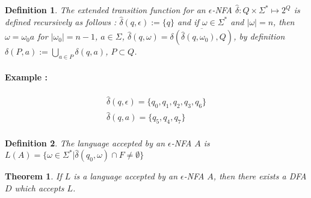 \documentclass[a4paper,11pt]{article}
\newtheorem{mydef}{Definition}
\newtheorem{thm}{Theorem}[section]
\begin{document}
\begin{mydef}
  The extended transition function for an $\epsilon$-NFA $\widehat{\delta} : Q
  \times \Sigma^* \mapsto 2^Q$ is defined recursively as follows :
  $\widehat{\delta}(q,\epsilon) := \{q\}$ and if $\omega \in \Sigma^*$ and
  $|\omega| = n$, then $\omega = \omega_0a$ for $|\omega_0| = n-1$, $a \in
  \Sigma$, $\widehat{\delta}(q,\omega) =
  \overline{\delta(\widehat{\delta}(q,\omega_0),Q)}$, by definition $\delta(P,a)
  := \bigcup_{a \in P} \delta(q,a)$, $P \subset Q$.
\end{mydef}

\paragraph{Example : }

\begin{center}
\end{center}

\begin{gather*}
  \widehat{\delta}(q,\epsilon) = \{q_0,q_1,q_2,q_3,q_6\} \\
  \widehat{\delta}(q,a) = \{q_5,q_4,q_7\} \\
\end{gather*}

\begin{mydef}
  The language accepted by an $\epsilon$-NFA $A$ is $L(A) = \{\omega \in
  \Sigma^* | \widehat{\delta}(q_0,\omega) \cap F \neq \emptyset\}$
\end{mydef}

\begin{thm}
  If $L$ is a language accepted by an $\epsilon$-NFA $A$, then there exists a
  DFA $D$ which accepts $L$.
\end{thm}
\end{document}

